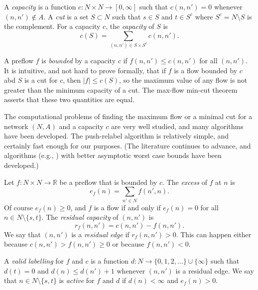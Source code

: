 \documentclass[12pt]{article}
\theoremstyle{definition}
\renewcommand{\Re}{\mathbb{R}}
\begin{document}
\begin{appendix}
A \emph{capacity} is a function $c \colon N \times N \to [0,\infty]$
such that $c(n,n') = 0$ whenever $(n,n') \notin A$.  A \emph{cut} is a
set $S \subset N$ such that $s \in S$ and $t \in S^c$ where $S^c = N
\setminus S$ is the complement.  For a capacity $c$, the
\emph{capacity} of $S$ is
$$c(S) = \sum_{(n,n') \in S \times S^c} c(n,n').$$

A preflow $f$ is \emph{bounded} by a capacity $c$ if $f(n,n') \le
c(n,n')$ for all $(n,n')$.  It is intuitive, and not hard to prove
formally, that if $f$ is a flow bounded by $c$ abd $S$ is a cut for
$c$, then $|f| \le c(S)$, so the maximum value of any flow is not
greater than the minimum capacity of a cut.  The max-flow min-cut
theorem \citep{FoFu56} asserts that these two quantities are equal.

The computational problems of finding the maximum flow or a minimal
cut for a network $(N,A)$ and a capacity $c$ are very well studied,
and many algorithms have been developed.  The push-relabel algorithm
is relatively simple, and certainly fast enough for our purposes.
(The literature continues to advance, and algorithms (e.g.,
\cite{CKLGS22}) with better asymptotic worst case bounds have been
developed.)
  
Let $f \colon N \times N \to \Re$ be a preflow that is bounded by $c$.
The \emph{excess} of $f$ at $n$ is $$e_f(n) = \sum_{n' \in N} f(n',n).$$
Of course $e_f(n) \ge 0$, and $f$ is a flow if and only if $e_f(n) =
0$ for all $n \in N \setminus \{s,t\}$.  The \emph{residual capacity}
of $(n,n')$ is $$r_f(n,n') = c(n,n') - f(n,n').$$  We say that $(n,n')$
is a \emph{residual edge} if $r_f(n,n') > 0$.  This can happen either
because $c(n,n') > f(n,n') \ge 0$ or because $f(n,n') < 0$.

A \emph{valid labelling} for $f$ and $c$ is a function $d \colon N \to
\{0,1,2,\ldots\} \cup \{\infty\}$ such that $d(t) = 0$ and $d(n) \le
d(n') + 1$ whenever $(n,n')$ is a residual edge.  We say that $n \in N
\setminus \{s,t\}$ is \emph{active} for $f$ and $d$ if $d(n) < \infty$
and $e_f(n) > 0$.


\end{appendix}
\end{document}
